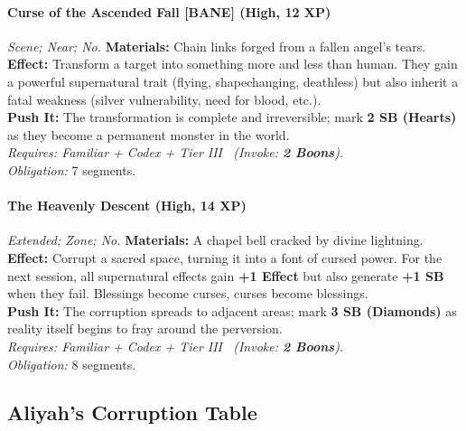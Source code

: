 \paragraph{Curse of the Ascended Fall \textnormal{[BANE]} (High, 12 XP)} \emph{Scene; Near; No.}
\textbf{Materials:} Chain links forged from a fallen angel's tears.\\
\textbf{Effect:} Transform a target into something more and less than human. They gain a powerful supernatural trait (flying, shapechanging, deathless) but also inherit a fatal weakness (silver vulnerability, need for blood, etc.).\\
\textbf{Push It:} The transformation is complete and irreversible; mark \textbf{2 SB (Hearts)} as they become a permanent monster in the world.\\
\emph{Requires: Familiar + Codex + Tier III \ (\textit{Invoke:} \textbf{2 Boons}).}\\
\emph{Obligation:} 7 segments.

\paragraph{The Heavenly Descent (High, 14 XP)} \emph{Extended; Zone; No.}
\textbf{Materials:} A chapel bell cracked by divine lightning.\\
\textbf{Effect:} Corrupt a sacred space, turning it into a font of cursed power. For the next session, all supernatural effects gain \textbf{+1 Effect} but also generate \textbf{+1 SB} when they fail. Blessings become curses, curses become blessings.\\
\textbf{Push It:} The corruption spreads to adjacent areas; mark \textbf{3 SB (Diamonds)} as reality itself begins to fray around the perversion.\\
\emph{Requires: Familiar + Codex + Tier III \ (\textit{Invoke:} \textbf{2 Boons}).}\\
\emph{Obligation:} 8 segments.

\subsection*{Aliyah's Corruption Table}
\label{sec:aliyah-corruption}

